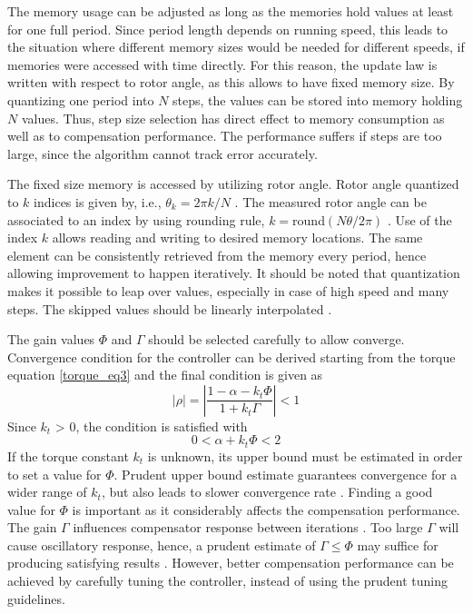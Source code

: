 The memory usage can be adjusted as long as the memories hold values at least for one full period. Since period length depends on running speed, this leads to the situation where different memory sizes would be needed for different speeds, if memories were accessed with time directly. For this reason, the update law is written with respect to rotor angle, as this allows to have fixed memory size. By quantizing one period into $N$ steps, the values can be stored into memory holding $N$ values. Thus, step size selection has direct effect to memory consumption as well as to compensation performance. The performance suffers if steps are too large, since the algorithm cannot track error accurately.

The fixed size memory is accessed by utilizing rotor angle. Rotor angle quantized to $k$ indices is given by, i.e., $\theta_k = 2\pi k / N$ \cite{ILC:2012}. The measured rotor angle can be associated to an index by using rounding rule, $k = $round$(N \theta / 2 \pi)$ \cite{ILC:2012}. Use of the index $k$ allows reading and writing to desired memory locations. The same element can be consistently retrieved from the memory every period, hence allowing improvement to happen iteratively. It should be noted that quantization makes it possible to leap over values, especially in case of high speed and many steps. The skipped values should be linearly interpolated \cite{ILC:2012}.

The gain values $\Phi$ and $\Gamma$ should be selected carefully to allow converge. Convergence condition for the controller can be derived starting from the torque equation \eqref{torque_eq3} and the final condition is given as \cite{ILC:2004}
\begin{equation}
    \left| \rho \right| = \left| \frac{1-\alpha - k_t \Phi}{1 + k_t \Gamma} \right| < 1
\end{equation}
Since $k_t$ > 0, the condition is satisfied with \cite{ILC:2004}
\begin{equation}
    0 < \alpha + k_t \Phi < 2
\end{equation}
If the torque constant $k_t$ is unknown, its upper bound must be estimated in order to set a value for $\Phi$. Prudent upper bound estimate guarantees convergence for a wider range of $k_t$, but also leads to slower convergence rate \cite{ILC:2004, ILC:2005}. Finding a good value for $\Phi$ is important as it considerably affects the compensation performance. The gain $\Gamma$ influences compensator response between iterations \cite{ILC:2005}. Too large $\Gamma$ will cause oscillatory response, hence, a prudent estimate of $\Gamma \leq \Phi$ may suffice for producing satisfying results \cite{ILC:2004}. However, better compensation performance can be achieved by carefully tuning the controller, instead of using the prudent tuning guidelines.

